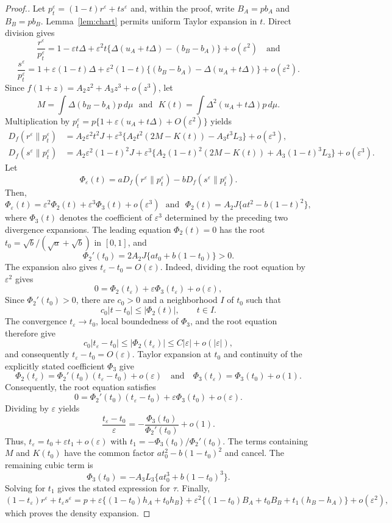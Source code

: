 \documentclass[11pt]{article}
\theoremstyle{plain}
\theoremstyle{definition}
\theoremstyle{definition}
\newcommand{\eps}{\varepsilon}
\begin{document}
\begin{proof}[Proof.]
Let $p_t^\eps=(1-t)r^\eps+ts^\eps$ and, within the proof, write $B_A=pb_A$ and $B_B=pb_B$. Lemma~\ref{lem:chart} permits uniform Taylor expansion in $t$. Direct division gives
\[
\frac{r^\eps}{p_t^\eps}=1-\eps t\Delta+
\eps^2t\{\Delta(u_A+t\Delta)-(b_B-b_A)\}+o(\eps^2) \quad\text{and}
\]
\[
\frac{s^\eps}{p_t^\eps}=1+\eps(1-t)\Delta+
\eps^2(1-t)\{(b_B-b_A)-\Delta(u_A+t\Delta)\}+o(\eps^2).
\]
Since $f(1+z)=A_2z^2+A_3z^3+o(z^3)$, let
\[
M=\int \Delta(b_B-b_A)p\,d\mu \,\,\,\,\text{and}\,\,\,\,
K(t)=\int \Delta^2(u_A+t\Delta)p\,d\mu .
\]
Multiplication by $p_t^\eps=p\{1+\eps(u_A+t\Delta)+O(\eps^2)\}$ yields
\[
\begin{aligned}
D_f(r^\eps\|p_t^\eps)&=A_2\eps^2t^2J
+\eps^3\{A_2t^2(2M-K(t))-A_3t^3L_3\}+o(\eps^3),\\
D_f(s^\eps\|p_t^\eps)&=A_2\eps^2(1-t)^2J
+\eps^3\{A_2(1-t)^2(2M-K(t))+A_3(1-t)^3L_3\}+o(\eps^3).
\end{aligned}
\]
Let
\[
\Phi_\eps(t)=aD_f(r^\eps\|p_t^\eps)-bD_f(s^\eps\|p_t^\eps).
\]
Then,
\[
\Phi_\eps(t)=\eps^2\Phi_2(t)+\eps^3\Phi_3(t)+o(\eps^3) \,\,\,\,\text{and}\,\,\,\,
\Phi_2(t)=A_2J\{at^2-b(1-t)^2\},
\]
where $\Phi_3(t)$ denotes the coefficient of $\eps^3$ determined by the preceding two divergence expansions.
The leading equation $\Phi_2(t)=0$ has the root $t_0=\sqrt b/(\sqrt a+\sqrt b)$ in $[0,1]$, and
\[
\Phi_2'(t_0)=2A_2J\{at_0+b(1-t_0)\}>0.
\]
The expansion also gives $t_\eps-t_0=O(\eps)$. Indeed, dividing the root equation by $\eps^2$ gives
\[
0=\Phi_2(t_\eps)+\eps\Phi_3(t_\eps)+o(\eps),
\]
Since $\Phi_2'(t_0)>0$, there are $c_0>0$ and a neighborhood $I$ of $t_0$ such that
\[
c_0|t-t_0|\le |\Phi_2(t)|,\qquad t\in I.
\]
The convergence $t_\eps\to t_0$, local boundedness of $\Phi_3$, and the root equation therefore give
\[
c_0|t_\eps-t_0|
\le |\Phi_2(t_\eps)|
\le C|\eps|+o(|\eps|),
\]
and consequently $t_\eps-t_0=O(\eps)$. Taylor expansion at $t_0$ and continuity of the explicitly stated coefficient $\Phi_3$ give
\[
\Phi_2(t_\eps)=\Phi_2'(t_0)(t_\eps-t_0)+o(\eps)
\quad\text{and}\quad
\Phi_3(t_\eps)=\Phi_3(t_0)+o(1).
\]
Consequently, the root equation satisfies
\[
0=\Phi_2'(t_0)(t_\eps-t_0)+\eps\Phi_3(t_0)+o(\eps).
\]
Dividing by $\eps$ yields
\[
\frac{t_\eps-t_0}{\eps}=-\frac{\Phi_3(t_0)}{\Phi_2'(t_0)}+o(1).
\]
Thus, $t_\eps=t_0+\eps t_1+o(\eps)$ with $t_1=-\Phi_3(t_0)/\Phi_2'(t_0)$.
The terms containing $M$ and $K(t_0)$ have the common factor $at_0^2-b(1-t_0)^2$ and cancel. The remaining cubic term is
\[
\Phi_3(t_0)=-A_3L_3\{a t_0^3+b(1-t_0)^3\}.
\]
Solving for $t_1$ gives the stated expression for $\tau$. Finally,
\[
(1-t_\eps)r^\eps+t_\eps s^\eps
=p+\eps\{(1-t_0)h_A+t_0h_B\}
+\eps^2\{(1-t_0)B_A+t_0B_B+t_1(h_B-h_A)\}+o(\eps^2),
\]
which proves the density expansion.
\end{proof}
\end{document}
